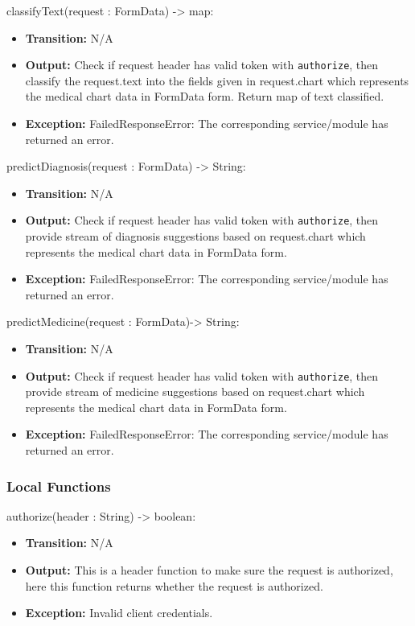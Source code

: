 \documentclass[12pt, titlepage]{article}
\begin{document}
\noindent classifyText(request : FormData) -> map:
\begin{itemize}
    \item \textbf{Transition:} N/A
    \item \textbf{Output:} Check if request header has valid token with \texttt{authorize}, then classify the request.text into the fields given in request.chart which represents the medical chart data in FormData form. Return map of text classified. 
    \item \textbf{Exception:} FailedResponseError: The corresponding service/module has returned an error.
\end{itemize}

\noindent predictDiagnosis(request : FormData) -> String:
\begin{itemize}
    \item \textbf{Transition:} N/A
    \item \textbf{Output:} Check if request header has valid token with \texttt{authorize}, then provide stream of diagnosis suggestions based on request.chart which represents the medical chart data in FormData form.
    \item \textbf{Exception:} FailedResponseError: The corresponding service/module has returned an error.
\end{itemize}

\noindent predictMedicine(request : FormData)-> String:
\begin{itemize}
    \item \textbf{Transition:} N/A
    \item \textbf{Output:} Check if request header has valid token with \texttt{authorize}, then provide stream of medicine suggestions based on request.chart which represents the medical chart data in FormData form.
    \item \textbf{Exception:} FailedResponseError: The corresponding service/module has returned an error.
\end{itemize}

\subsubsection{Local Functions}

\noindent authorize(header : String) -> boolean:
\begin{itemize}
    \item \textbf{Transition:} N/A
    \item \textbf{Output:} This is a header function to make sure the request is authorized, here this function returns whether the request is authorized.
    \item \textbf{Exception:} Invalid client credentials.
\end{itemize}
\end{document}
